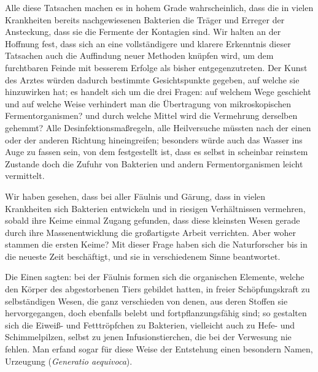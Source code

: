 \documentclass[a4paper, 11pt, oneside, english]{article}
\begin{document}
Alle diese Tatsachen machen es in hohem Grade wahrscheinlich, dass die in vielen Krankheiten bereits nachgewiesenen Bakterien die Träger und Erreger der Ansteckung, dass sie die Fermente der Kontagien sind. Wir halten an der Hoffnung fest, dass sich an eine vollständigere und klarere Erkenntnis dieser Tatsachen auch die Auffindung neuer Methoden knüpfen wird, um dem furchtbaren Feinde mit besserem Erfolge als bisher entgegenzutreten. Der Kunst des Arztes würden dadurch bestimmte Gesichtspunkte gegeben, auf welche sie hinzuwirken hat; es handelt sich um die drei Fragen: auf welchem Wege geschieht und auf welche Weise verhindert man die Übertragung von mikroskopischen Fermentorganismen? und durch welche Mittel wird die Vermehrung derselben gehemmt? Alle Desinfektionsmaßregeln, alle Heilversuche müssten nach der einen oder der anderen Richtung hineingreifen; besonders würde auch das Wasser ins Auge zu fassen sein, von dem festgestellt ist, dass es selbst in scheinbar reinstem Zustande doch die Zufuhr von Bakterien und andern Fermentorganismen leicht vermittelt.

Wir haben gesehen, dass bei aller Fäulnis und Gärung, dass in vielen Krankheiten sich Bakterien entwickeln und in riesigen Verhältnissen vermehren, sobald ihre Keime einmal Zugang gefunden, dass diese kleinsten Wesen gerade durch ihre Massenentwicklung die großartigste Arbeit verrichten. Aber woher stammen die ersten Keime? Mit dieser Frage haben sich die Naturforscher bis in die neueste Zeit beschäftigt, und sie in verschiedenem Sinne beantwortet.

Die Einen sagten: bei der Fäulnis formen sich die organischen Elemente, welche den Körper des abgestorbenen Tiers gebildet hatten, in freier Schöpfungskraft zu selbständigen Wesen, die ganz verschieden von denen, aus deren Stoffen sie hervorgegangen, doch ebenfalls belebt und fortpflanzungsfähig sind; so gestalten sich die Eiweiß- und Fetttröpfchen zu Bakterien, vielleicht auch zu Hefe- und Schimmelpilzen, selbst zu jenen Infusionstierchen, die bei der Verwesung nie fehlen. Man erfand sogar für diese Weise der Entstehung einen besondern Namen, Urzeugung (\emph{Generatio aequivoca}).
\end{document}
